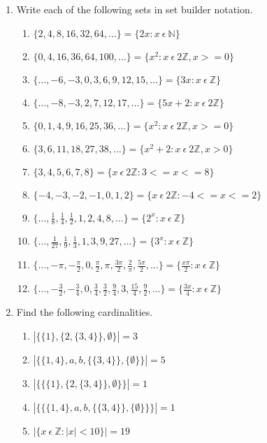 \documentclass[../main.tex]{subfiles}
\begin{document}
\begin{enumerate}
\begin{enumerate}
    \end{enumerate}

  \item Write each of the following sets in set builder notation.

    \begin{enumerate}[resume]

      \item $\{2, 4, 8, 16, 32, 64, \ldots\} = \{2x: x~\epsilon~\mathbb{N}\}$
      \item $\{0, 4, 16, 36, 64, 100, \ldots\} = \{x^2: x~\epsilon~2\mathbb{Z}, x >= 0\}$
      \item $\{\ldots, -6, -3, 0, 3, 6, 9, 12, 15, \ldots\} = \{3x: x~\epsilon~\mathbb{Z}\}$
      \item $\{\ldots, -8, -3, 2, 7, 12, 17, \ldots\} = \{5x+2: x~\epsilon~2\mathbb{Z}\}$
      \item $\{0, 1, 4, 9, 16, 25, 36, \ldots\} = \{x^2: x~\epsilon~2\mathbb{Z}, x >= 0\}$

      \item $\{3, 6, 11, 18, 27, 38, \ldots\} = \{x^2+2: x~\epsilon~2\mathbb{Z}, x > 0\}$
      \item $\{3, 4, 5, 6, 7, 8\} = \{x~\epsilon~2\mathbb{Z}: 3 <= x <= 8\}$
      \item $\{-4, -3, -2, -1, 0, 1, 2\} = \{x~\epsilon~2\mathbb{Z}: -4 <= x <= 2\}$
      \item $\{\ldots, \frac{1}{8}, \frac{1}{4}, \frac{1}{2}, 1, 2, 4, 8, \ldots\} = \{2^x: x~\epsilon~\mathbb{Z}\}$
      \item $\{\ldots, \frac{1}{27}, \frac{1}{9}, \frac{1}{3}, 1, 3, 9, 27, \ldots\} = \{3^x: x~\epsilon~\mathbb{Z}\}$

      \item $\{\ldots, -\pi, -\frac{\pi}{2}, 0, \frac{\pi}{2}, \pi, \frac{3\pi}{2}, \frac{2}{\pi}, \frac{5\pi}{2}, \ldots\} = \{\frac{x\pi}{2}: x~\epsilon~\mathbb{Z}\}$
      \item $\{\ldots, -\frac{3}{2}, -\frac{3}{4}, 0, \frac{3}{4}, \frac{3}{2}, \frac{9}{4}, 3, \frac{15}{4}, \frac{9}{2}, \ldots\} = \{\frac{3x}{4}: x~\epsilon~\mathbb{Z}\}$
      
    \end{enumerate}

  \item Find the following cardinalities.

    \begin{enumerate}[resume]
      
      \item $|\{\{1\}, \{2, \{3, 4\}\}, \emptyset \}| = 3$
      \item $|\{\{1, 4\}, a, b, \{\{3, 4\}\}, \{ \emptyset \}\}| = 5$
      \item $|\{\{\{1\}, \{2, \{3, 4\}\}, \emptyset \}\}| = 1$
      \item $|\{\{\{1, 4\}, a, b, \{\{3, 4\}\}, \{ \emptyset \}\}\}| = 1$
      \item $|\{x~\epsilon~\mathbb{Z} : |x| < 10\}| = 19$


\end{enumerate}
\end{enumerate}
\end{document}
